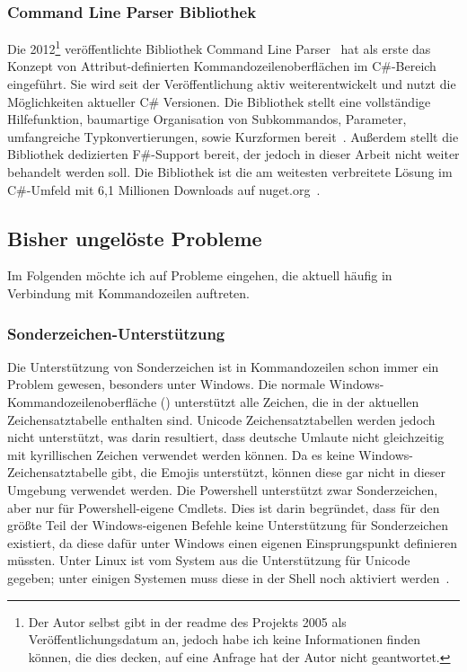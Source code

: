 \subsubsection{Command Line Parser Bibliothek}
Die 2012\footnote{Der Autor selbst gibt in der readme des Projekts 2005 als Veröffentlichungsdatum an, jedoch habe ich keine Informationen finden können, die dies decken, auf eine Anfrage hat der Autor nicht geantwortet.} veröffentlichte Bibliothek Command Line Parser~\cite{FirstCommandLineParserCommit}
hat als erste das Konzept von Attribut-definierten Kommandozeilenoberflächen im C\#-Bereich eingeführt.
Sie wird seit der Veröffentlichung aktiv weiterentwickelt und nutzt die Möglichkeiten aktueller C\# Versionen.
Die Bibliothek stellt eine vollständige Hilfefunktion, baumartige Organisation von Subkommandos, Parameter, umfangreiche Typkonvertierungen, sowie Kurzformen bereit~\cite{CommandLineParserWiki}.
Außerdem stellt die Bibliothek dedizierten F\#-Support bereit, der jedoch in dieser Arbeit nicht weiter behandelt werden soll.
Die Bibliothek ist die am weitesten verbreitete Lösung im C\#-Umfeld mit 6,1 Millionen Downloads auf nuget.org~\cite{CommandLineParserNuget}.
\subsection{Bisher ungelöste Probleme}\label{subsec:currentproblems}
Im Folgenden möchte ich auf Probleme eingehen, die aktuell häufig in Verbindung mit
Kommandozeilen auftreten.
\subsubsection{Sonderzeichen-Unterstützung}\label{Sonderzeichen}
Die Unterstützung von Sonderzeichen ist in Kommandozeilen schon immer ein Problem gewesen,
besonders unter Windows.
Die normale Windows-Kommandozeilenoberfläche ()
unterstützt alle Zeichen, die in der aktuellen Zeichensatztabelle enthalten sind.
Unicode Zeichensatztabellen werden jedoch nicht unterstützt, was darin resultiert, dass deutsche Umlaute
nicht gleichzeitig mit kyrillischen Zeichen verwendet werden können.
Da es keine Windows-Zeichensatztabelle gibt, die Emojis unterstützt, können diese gar nicht in dieser Umgebung
verwendet werden.
Die Powershell unterstützt zwar Sonderzeichen, aber nur für Powershell-eigene Cmdlets.
Dies ist darin begründet, dass für den gr\"oßte Teil der Windows-eigenen Befehle keine Unterst\"utzung f\"ur Sonderzeichen existiert,
da diese dafür unter Windows einen eigenen Einsprungspunkt definieren müssten.
Unter Linux ist vom System aus die Unterstützung für Unicode gegeben;
unter einigen Systemen muss diese in der Shell noch aktiviert werden~\cite{LinuxUnicode}.

